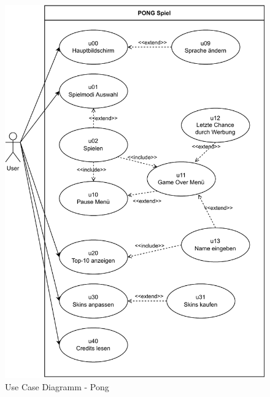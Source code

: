 \begin{figure}
    \includegraphics[width=\textwidth]{diagramme/pdf/UML-UseCase.pdf}
    \caption{Use Case Diagramm - Pong}
    \label{fig:use-case-diagram}
\end{figure}
